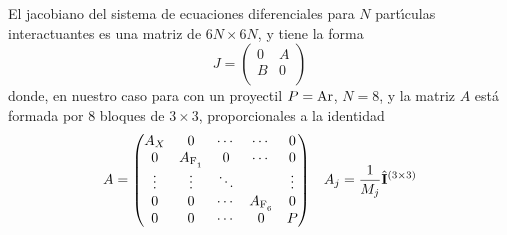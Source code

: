 El jacobiano del sistema de ecuaciones diferenciales para $N$ part\'{\i}culas interactuantes es una matriz de $6N \times 6N$, y tiene la forma
\begin{equation}
  \label{Q:Jacob-ec-dif}
  J =
  \begin{pmatrix}
    0 & A \\
    B & 0 \\
  \end{pmatrix}
\end{equation}
donde, en nuestro caso para  con un proyectil $P=\ce{Ar}$, $N=8$, y la matriz $A$ est\'{a} formada por 8 bloques de $3 \times 3$, proporcionales a la identidad
\begin{align}
  \label{Q:Jacob-ec-dif-A}
  A &=
\begin{pmatrix}
  A_{X} & 0 & \cdots &  \cdots & 0 \\
  0 & A_{\ce{F1}}& 0 & \cdots & 0 \\
  \vdots  & \vdots  & \ddots &  & \vdots  \\
  0 &  0 &\cdots &  A_{\ce{F6}} & 0 \\
  0 & 0 & \cdots & 0 & P
\end{pmatrix}    &A_{j} = \frac{1}{M_{j}} \oper{I}^{(3\times 3)}
\end{align}

